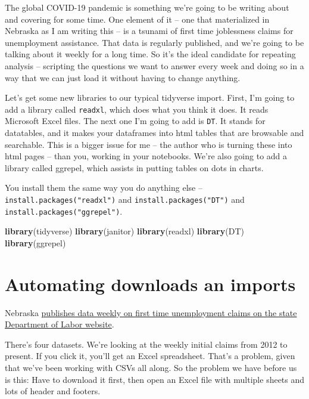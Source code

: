 \documentclass[]{book}
\newenvironment{Shaded}{\begin{snugshade}}{\end{snugshade}}
\newcommand{\KeywordTok}[1]{\textcolor[rgb]{0.13,0.29,0.53}{\textbf{#1}}}
\newcommand{\NormalTok}[1]{#1}
\begin{document}
The global COVID-19 pandemic is something we're going to be writing about and covering for some time. One element of it -- one that materialized in Nebraska as I am writing this -- is a tsunami of first time joblessness claims for unemployment assistance. That data is regularly published, and we're going to be talking about it weekly for a long time. So it's the ideal candidate for repeating analysis -- scripting the questions we want to answer every week and doing so in a way that we can just load it without having to change anything.

Let's get some new libraries to our typical tidyverse import. First, I'm going to add a library called \texttt{readxl}, which does what you think it does. It reads Microsoft Excel files. The next one I'm going to add is \texttt{DT}. It stands for datatables, and it makes your dataframes into html tables that are browsable and searchable. This is a bigger issue for me -- the author who is turning these into html pages -- than you, working in your notebooks. We're also going to add a library called ggrepel, which assists in putting tables on dots in charts.

You install them the same way you do anything else -- \texttt{install.packages("readxl")} and \texttt{install.packages("DT")} and \texttt{install.packages("ggrepel")}.

\begin{Shaded}
\begin{Highlighting}[]
\KeywordTok{library}\NormalTok{(tidyverse)}
\KeywordTok{library}\NormalTok{(janitor)}
\KeywordTok{library}\NormalTok{(readxl)}
\KeywordTok{library}\NormalTok{(DT)}
\KeywordTok{library}\NormalTok{(ggrepel)}
\end{Highlighting}
\end{Shaded}

\hypertarget{automating-downloads-an-imports}{%
\section{Automating downloads an imports}\label{automating-downloads-an-imports}}

Nebraska \href{https://neworks.nebraska.gov/gsipub/index.asp?docid=710}{publishes data weekly on first time unemployment claims on the state Department of Labor website}.

There's four datasets. We're looking at the weekly initial claims from 2012 to present. If you click it, you'll get an Excel spreadsheet. That's a problem, given that we've been working with CSVs all along. So the problem we have before us is this: Have to download it first, then open an Excel file with multiple sheets and lots of header and footers.
\end{document}
